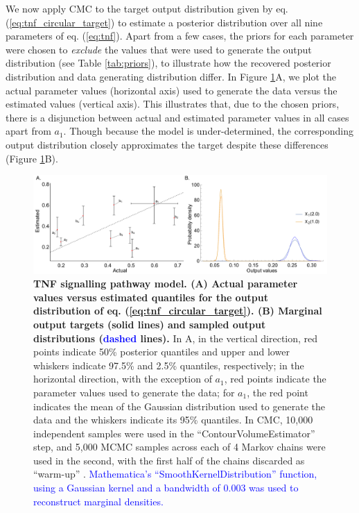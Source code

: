 We now apply CMC to the target output distribution given by eq. (\ref{eq:tnf_circular_target}) to estimate a posterior distribution over all nine parameters of eq. (\ref{eq:tnf}). Apart from a few cases, the priors for each parameter were chosen to \emph{exclude} the values that were used to generate the output distribution (see Table \ref{tab:priors}), to illustrate how the recovered posterior distribution and data generating distribution differ. In Figure \ref{fig:tnf_circular_versus}A, we plot the actual parameter values (horizontal axis) used to generate the data versus the estimated values (vertical axis). This illustrates that, due to the chosen priors, there is a disjunction between actual and estimated parameter values in all cases apart from $a_1$. Though because the model is under-determined, the corresponding output distribution closely approximates the target despite these differences (Figure \ref{fig:tnf_circular_versus}B).


\begin{figure}[H]
\centerline{\includegraphics[width=1.0\textwidth]{../figures/tnf_circular_both.pdf}}
\caption{\textbf{TNF signalling pathway model. (A) Actual parameter values versus estimated quantiles for the output distribution of eq. (\ref{eq:tnf_circular_target}). (B) Marginal output targets (solid lines) and sampled output distributions (\textcolor{blue}{dashed} lines).} In A, in the vertical direction, red points indicate 50\% posterior quantiles and upper and lower whiskers indicate 97.5\% and 2.5\% quantiles, respectively; in the horizontal direction, with the exception of $a_1$, red points indicate the parameter values used to generate the data; for $a_1$, the red point indicates the mean of the Gaussian distribution used to generate the data and the whiskers indicate its 95\% quantiles. In CMC, 10,000 independent samples were used in the ``ContourVolumeEstimator'' step, and 5,000 MCMC samples across each of 4 Markov chains were used in the second, with the first half of the chains discarded as ``warm-up'' \cite{lambert2018Student}. \textcolor{blue}{Mathematica's ``SmoothKernelDistribution'' function, using a Gaussian kernel \cite{mathematica} and a bandwidth of 0.003 was used to reconstruct marginal densities.}}
	\label{fig:tnf_circular_versus}
\end{figure}

